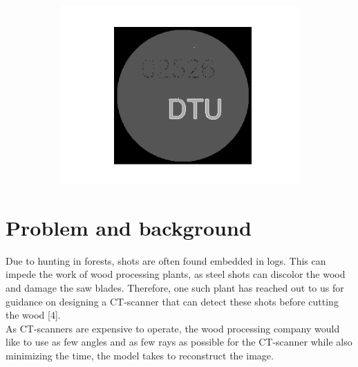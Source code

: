 \documentclass{article}
\begin{document}
\begin{figure}[H]
\begin{subfigure}[t]{0.5\linewidth}
\centering
\includegraphics[width=\linewidth]{code/test_logo_kmeans.png}
\end{subfigure}

\vspace{10pt}

\label{fig:front_page}
\end{figure}

\clearpage
{} 
\newpage


\section{Problem and background} 
\vspace*{-0.3\baselineskip}
Due to hunting in forests, shots are often found embedded in logs. This can impede the work of wood processing plants, as steel shots can discolor the wood and damage the saw blades. Therefore, one such plant has reached out to us for guidance on designing a CT-scanner that can detect these shots before cutting the wood [4]. \\
As CT-scanners are expensive to operate, the wood processing company would like to use as few angles and as few rays as possible for the CT-scanner while also minimizing the time, the model takes to reconstruct the image.
\end{document}
